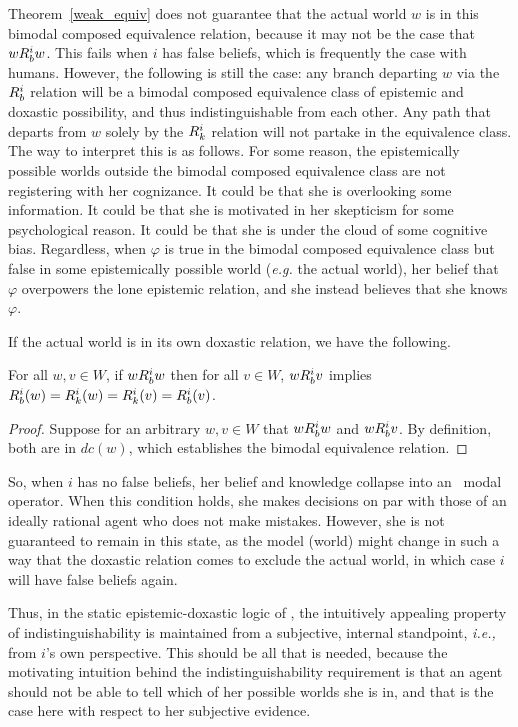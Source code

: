 Theorem~\ref{weak_equiv} does not guarantee that the actual world $w$ is in this bimodal composed equivalence relation, because it may not be the case that $wR_{b}^iw$. This fails when $i$ has false beliefs, which is frequently the case with humans. However, the following is still the case: any branch departing $w$ via the $R_{b}^i$ relation will be a bimodal composed equivalence class of epistemic and doxastic possibility, and thus indistinguishable from each other. Any path that departs from $w$ solely by the $R_{k}^i$ relation will not partake in the equivalence class. The way to interpret this is as follows. For some reason, the epistemically possible worlds outside the bimodal composed equivalence class are not registering with her cognizance. It could be that she is overlooking some information. It could be that she is motivated in her skepticism for some psychological reason. It could be that she is under the cloud of some cognitive bias. Regardless, when $\varphi$ is true in the bimodal composed equivalence class but false in some epistemically possible world (\emph{e.g.} the actual world), her belief that $\varphi$ overpowers the lone epistemic relation, and she instead believes that she knows $\varphi$.

If the actual world is in its own doxastic relation, we have the following. 

\begin{theorem}
	For all $w,v \in W$, if $wR_{b}^i w$ then for all $v \in W$, $wR_{b}^iv$ implies $R_{b}^i(w) = R_{k}^i(w) = R_{k}^i(v) = R_{b}^i(v)$.
\end{theorem}
\begin{proof}
	Suppose for an arbitrary $w,v\in W$ that $wR_{b}^iw$ and $wR_{b}^iv$. By definition, both are in $dc(w)$, which establishes the bimodal equivalence relation.
\end{proof}

So, when $i$ has no false beliefs, her belief and knowledge collapse into an \SFive\ modal operator. When this condition holds, she makes decisions on par with those of an ideally rational agent who does not make mistakes. However, she is not guaranteed to remain in this state, as the model (world) might change in such a way that the doxastic relation comes to exclude the actual world, in which case $i$ will have false beliefs again.

Thus, in the static epistemic-doxastic logic of \DASL, the intuitively appealing property of indistinguishability is maintained from a subjective, internal standpoint, \emph{i.e.,} from $i$'s own perspective. This should be all that is needed, because the motivating intuition behind the indistinguishability requirement is that an agent should not be able to tell which of her possible worlds she is in, and that is the case here with respect to her subjective evidence.

